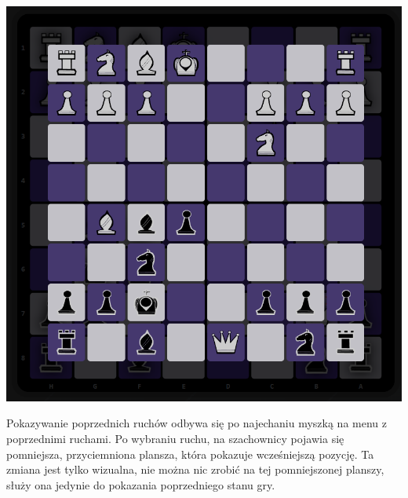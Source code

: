 \documentclass[12pt,a4paper]{article}
\begin{document}
\begin{minipage}[t]{0.45\textwidth} 
    \vspace{0pt} 
    \centering 
    \includegraphics[width=\linewidth]{images/ins_min_prev.png} 
\end{minipage} 
\hfill 
\begin{minipage}[t]{0.45\textwidth} 
    \vspace{0pt}
    \raggedright 
    Pokazywanie poprzednich ruchów odbywa się po najechaniu myszką na menu z poprzednimi ruchami. Po wybraniu ruchu, na szachownicy pojawia się pomniejsza, przyciemniona plansza, która pokazuje wcześniejszą pozycję. Ta zmiana jest tylko wizualna, nie można nic zrobić na tej pomniejszonej planszy, służy ona jedynie do pokazania poprzedniego stanu gry.
\end{minipage}

\vspace{1cm}
\end{document}
